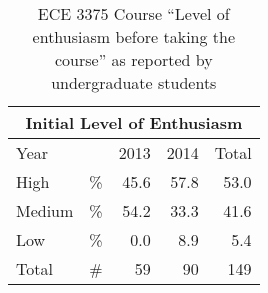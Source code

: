 \begin{table}[!hb]
    \centering
    \begin{tabular}{lc|r|r|r}
        \multicolumn{5}{c}{Initial Level of Enthusiasm} \\ \hline\hline
        \multicolumn{2}{l}{Year} & \multicolumn{1}{|c}{2013} & \multicolumn{1}{|c}{2014} & \multicolumn{1}{|c}{Total} \\ \hline
        High          & \%       & 45.6                     & 57.8                     & 53.0                      \\ 
        Medium        & \%       & 54.2                     & 33.3                     & 41.6                      \\
        Low           & \%       & 0.0                      & 8.9                      & 5.4                       \\ 
        Total         & \#       & 59                       & 90                       & 149                       \\ \hline
    \end{tabular}
    \caption{ECE 3375 Course ``Level of enthusiasm before taking the course'' as reported by undergraduate students\cite{evals:ece3375-2013, evals:ece3375-2014}} 
    \label{table-course-enthusiasm-ece3375}
\end{table}

